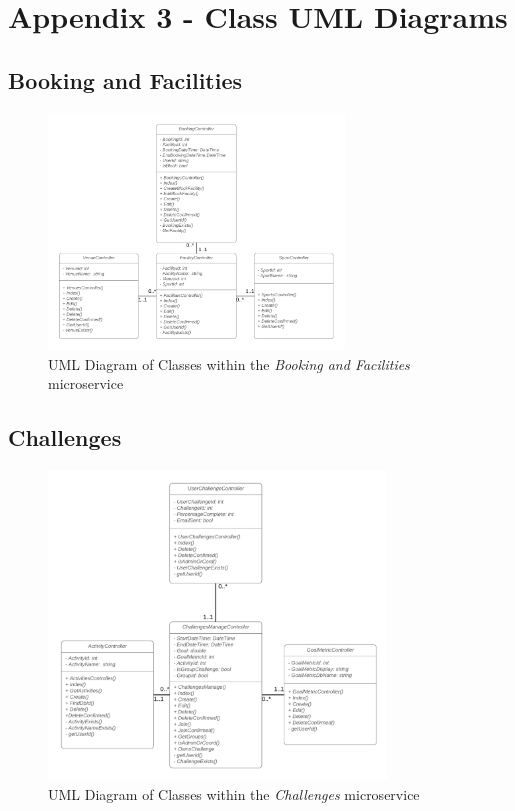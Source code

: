 \section{Appendix 3 - Class UML Diagrams}
\label{Appendix_3}

\subsection{Booking and Facilities}
\begin{figure}[H]
    \centering
    \includegraphics[width=0.7\textwidth]{Images/class_uml/booking_facilities.png}
    \caption{UML Diagram of Classes within the \textit{Booking and Facilities} microservice}
    \label{fig:class_uml:booking-facilities}
\end{figure}

\subsection{Challenges}
\begin{figure}[H]
    \centering
    \includegraphics[width=0.8\textwidth]{Images/class_uml/challenges.png}
    \caption{UML Diagram of Classes within the \textit{Challenges} microservice}
    \label{fig:class_uml:challenges}
\end{figure}

